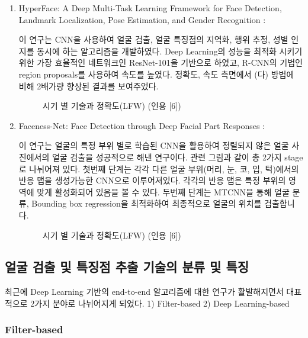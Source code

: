 \documentclass{oblivoir}
\begin{document}
\begin{enumerate}
    \item HyperFace: A Deep Multi-Task Learning Framework for Face Detection, Landmark Localization, Pose Estimation, and Gender Recognition : 

    이 연구는 CNN을 사용하여 얼굴 검출, 얼굴 특징점의 지역화, 행위 추정, 성별 인지를 동시에 하는 알고리즘을 개발하였다. 
    Deep Learning의 성능을 최적화 시키기 위한 가장 효율적인 네트워크인 ResNet-101을 기반으로 하였고, R-CNN의 기법인 region proposals를 사용하여 속도를 높였다. 
    정확도, 속도 측면에서 (다) 방법에 비해 2배가량 향상된 결과를 보여주었다. 

    \begin{figure}[h!]
        \centering
        \caption{시기 별 기술과 정확도(LFW) (인용 [6])    }
    \end{figure}

    \item Faceness-Net: Face Detection through Deep Facial Part Responses : 

    이 연구는 얼굴의 특정 부위 별로 학습된 CNN을 활용하여 정렬되지 않은 얼굴 사진에서의 얼굴 검출을 성공적으로 해낸 연구이다. 
    관련 그림과 같이 총 2가지 stage로 나뉘어져 있다. 첫번째 단계는 각각 다른 얼굴 부위(머리, 눈, 코, 입, 턱)에서의 반응 맵을 생성가능한 CNN으로 이루어져있다. 
    각각의 반응 맵은 특정 부위의 영역에 맞게 활성화되어 있음을 볼 수 있다. 
    두번째 단계는 MTCNN을 통해 얼굴 분류, Bounding box regression을 최적화하여 최종적으로 얼굴의 위치를 검출합니다. 

    \begin{figure}[h!]
        \centering
        \caption{시기 별 기술과 정확도(LFW) (인용 [6])    }
    \end{figure}

\end{enumerate}

\subsection{ 얼굴 검출 및 특징점 추출 기술의 분류 및 특징 }

최근에 Deep Learning 기반의 end-to-end 알고리즘에 대한 연구가 활발해지면서 대표적으로 2가지 분야로 나뉘어지게 되었다. 1) Filter-based 2) Deep Learning-based

\subsubsection{Filter-based}
\end{document}
